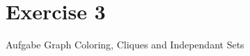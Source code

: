 
\section{Exercise 3}

\setcounter{exercise}{1}

\begin{frame}[allowframebreaks]{Aufgabe \thesection}{Graph Coloring, Cliques and Independant Sets}
\end{frame}
